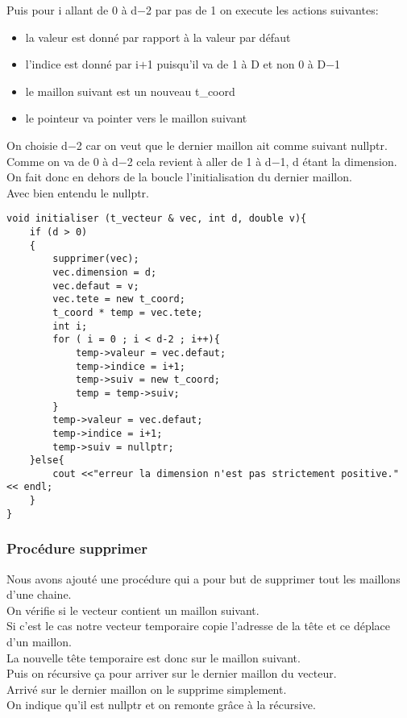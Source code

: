 \documentclass[a4paper,11pt,final]{article}
\begin{document}
Puis pour i allant de 0 à d$-$2 par pas de 1 on execute les actions suivantes:
\begin{itemize}
    \item la valeur est donné par rapport à la valeur par défaut
    \item l'indice est donné par i$+$1 puisqu'il va de 1 à D et non 0 à D$-$1
    \item le maillon suivant est un nouveau t\_coord
    \item le pointeur va pointer vers le maillon suivant
\end{itemize}
On choisie d$-$2 car on veut que le dernier maillon ait comme suivant nullptr.\\
Comme on va de 0 à d$-$2 cela revient à aller de 1 à d$-$1, d étant la dimension.\\
On fait donc en dehors de la boucle l'initialisation du dernier maillon.\\
Avec bien entendu  le nullptr.
\begin{verbatim}
void initialiser (t_vecteur & vec, int d, double v){
    if (d > 0)
    {
        supprimer(vec);
        vec.dimension = d;
        vec.defaut = v;
        vec.tete = new t_coord;
        t_coord * temp = vec.tete;
        int i;
        for ( i = 0 ; i < d-2 ; i++){
            temp->valeur = vec.defaut;
            temp->indice = i+1;
            temp->suiv = new t_coord;
            temp = temp->suiv;
        }
        temp->valeur = vec.defaut;
        temp->indice = i+1;
        temp->suiv = nullptr;
    }else{
        cout <<"erreur la dimension n'est pas strictement positive." << endl;
    }
}    
\end{verbatim}
\subsubsection{Procédure supprimer}
Nous avons ajouté une procédure qui a pour but de supprimer tout les maillons d'une chaine. \\
On vérifie si le vecteur contient un maillon suivant.\\
Si c'est le cas notre vecteur temporaire copie l'adresse de la tête et ce déplace d'un maillon.\\
La nouvelle tête temporaire est donc sur le maillon suivant.\\
Puis on récursive ça pour arriver sur le dernier maillon du vecteur.\\
Arrivé sur le dernier maillon on le supprime simplement.\\
On indique qu'il est nullptr et on remonte grâce à la récursive.\\
\end{document}
